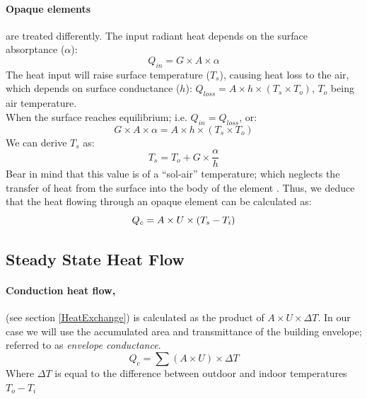 \paragraph{Opaque elements}are treated differently. The input radiant heat depends on the surface
absorptance ($\alpha$): 
\begin{equation}
Q_{in}=G\times A\times \alpha
\label{OpInRad}
\end{equation}
The heat input will raise surface temperature ($T_s$), causing heat loss to the air, which depends
on surface conductance ($h$): $Q_{loss}=A\times h\times (T_s\times T_o)$, $T_o$ being air
temperature.\\
When the surface reaches equilibrium; i.e. $Q_{in}=Q_{loss}$, or:
\begin{equation}
G\times A\times \alpha = A\times h\times (T_s\times T_o)
\end{equation}
We can derive $T_s$ as:
\begin{equation}
T_s=T_o+G\times \frac{\alpha}{h}
\end{equation}
Bear in mind that this value is of a ``sol-air'' temperature; which neglects the transfer of
heat from the surface into the body of the element \cite{szokolay08}. Thus, we deduce that the heat
flowing through an opaque element can be calculated as:
\begin{equation}
Q_c=A\times U \times (T_s-T_i)
\newline
\end{equation}
\flushleft

\subsection{Steady State Heat Flow}
\paragraph{Conduction heat flow,}(see section \ref{HeatExchange}) is calculated as the product of
$A\times U\times \Delta T$. In our case we will use the accumulated area and transmittance of the
building envelope; referred to as \emph{envelope conductance}.
\begin{equation}
Q_c=\sum(A\times U)\times \Delta T
\label{EnvConduct}
\end{equation}
{\footnotesize Where $\Delta T$ is equal to the difference between outdoor and indoor
temperatures $T_o-T_i$}

